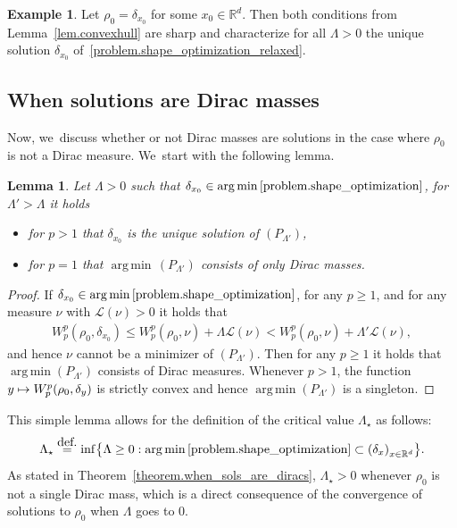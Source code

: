 \documentclass[11pt]{article}
\numberwithin{equation}{section}
\newcommand\mto{\mathchoice{\longmapsto}{\mapsto}{\mapsto}{\mapsto}}
\newtheorem{lemma}[theorem]{Lemma}
\theoremstyle{definition}
\newtheorem{example}[theorem]{Example}
\newcommand{\eqdef}{\ensuremath{\stackrel{\mbox{\upshape\tiny def.}}{=}}}
\newcommand{\RR}{\mathbb{R}}
\DeclareMathOperator*{\argmin}{arg\,min}
\begin{document}
\begin{example}
Let $\rho_0= \delta_{x_0}$ for some $x_0 \in \RR^d$. Then both
conditions from Lemma~\ref{lem.convexhull} are sharp and
characterize for all $\Lambda>0$ the unique solution $\delta_{x_0}$
of~\eqref{problem.shape_optimization_relaxed}.
\end{example}

\subsection{When solutions are Dirac masses}
Now, we~discuss whether or not Dirac masses are solutions in the case where $\rho_0$ is not a Dirac measure. We~start with the following lemma.

\begin{lemma}\label{lemma.trashold_lambda}
Let $\Lambda > 0$ such that $\delta_{x_0} \in \argmin\eqref{problem.shape_optimization}$,
for $\Lambda' > \Lambda$ it holds
\begin{itemize}
\item for $p > 1$ that $\delta_{x_0}$ is the unique solution
of $(P_{\Lambda'})$,
\item for $p = 1$ that $\argmin\, (P_{\Lambda'})$
consists of only Dirac masses.
\end{itemize}
\end{lemma}

\begin{proof}
If $\delta_{x_0} \in \argmin \eqref{problem.shape_optimization}$, for any $p \ge 1$, and for any measure $\nu$ with $\mathcal{L}(\nu) > 0$ it holds that
\begin{align*}
W_p^p(\rho_0, \delta_{x_0})
\le
W_p^p(\rho_0, \nu) + \Lambda \mathcal{L}(\nu)
<
W_p^p(\rho_0, \nu) + \Lambda' \mathcal{L}(\nu),
\end{align*}
and hence $\nu$ cannot be a minimizer of $(P_{\Lambda'})$. Then for any $p \ge 1$ it holds that $\argmin (P_{\Lambda'})$ consists of Dirac measures. Whenever $p > 1$, the function $y \mto W_p^p(\rho_0, \delta_y)$ is strictly convex and hence $\argmin (P_{\Lambda'})$ is a singleton.
\end{proof}

This simple lemma allows for the definition of the critical value $\Lambda_\star$ as follows:
\begin{equation}
\Lambda_\star
\eqdef
\inf
\bigl\{
\Lambda \ge 0:
\argmin \eqref{problem.shape_optimization}
\subset
\left(
\delta_{x}\right)_{x \in \RR^d}
\bigr\}.
\end{equation}
As stated in Theorem~\ref{theorem.when_sols_are_diracs}, $\Lambda_\star > 0$ whenever $\rho_0$ is not a single Dirac mass, which is a direct consequence of the convergence of solutions to $\rho_0$ when $\Lambda$ goes to $0$.
\end{document}
